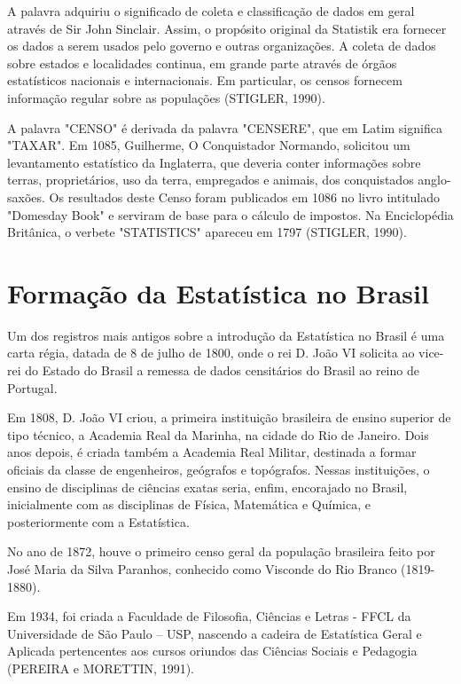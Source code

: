 A palavra adquiriu o significado de coleta e classificação de dados em geral
através de Sir John Sinclair. Assim, o propósito original da
Statistik era fornecer os dados a serem usados pelo governo e
outras organizações. A coleta de dados sobre estados e localidades
continua, em grande parte através de órgãos estatísticos nacionais
e internacionais. Em particular, os censos fornecem informação
regular sobre as populações (STIGLER, 1990).\vskip0.3cm

\inic A palavra "CENSO" é derivada da palavra "CENSERE", que em Latim
significa "TAXAR". Em 1085, Guilherme, O Conquistador Normando,
solicitou um levantamento estatístico da Inglaterra, que deveria
conter informações sobre terras, proprietários, uso da terra,
empregados e animais, dos conquistados anglo-saxões. Os resultados
deste Censo foram publicados em 1086 no livro intitulado "Domesday
Book" e serviram de base para o cálculo de impostos. Na Enciclopédia Britânica, o verbete "STATISTICS" apareceu em 1797 (STIGLER, 1990).



\section{Formação da Estatística no Brasil}

\inic Um dos registros mais antigos sobre a introdução da Estatística no Brasil é uma
carta régia, datada de 8 de julho de 1800, onde o rei D. João VI solicita ao vice-rei do
Estado do Brasil a remessa de dados censitários do Brasil ao reino de Portugal.\vskip0.3cm


\inic Em 1808, D. João VI criou, a primeira instituição brasileira de ensino superior de tipo técnico, a Academia Real da Marinha, na cidade do Rio de Janeiro. Dois anos depois, é criada também a Academia Real Militar, destinada a formar oficiais da classe de engenheiros, geógrafos e
topógrafos. Nessas instituições, o ensino de disciplinas de ciências exatas seria, enfim,
encorajado no Brasil, inicialmente com as disciplinas de Física, Matemática e Química,
e posteriormente com a Estatística.\vskip0.3cm


\inic No ano de 1872, houve o primeiro censo geral da população
brasileira feito por José Maria da Silva Paranhos, conhecido como
Visconde do Rio Branco (1819-1880).\vskip0.3cm 


\inic Em 1934, foi criada a Faculdade de Filosofia, Ciências e Letras - FFCL da Universidade de São Paulo – USP, nascendo a cadeira de Estatística Geral e Aplicada pertencentes aos cursos oriundos das Ciências Sociais e Pedagogia (PEREIRA e MORETTIN, 1991).\vskip0.3cm

